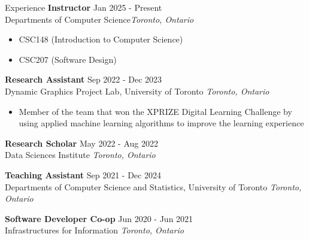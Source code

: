\documentclass{resume} %
\begin{document}
\begin{rSection}{Experience}
    \textbf{Instructor} \hfill Jan 2025 - Present\\Departments of Computer Science\hfill \textit{Toronto, Ontario}
    \begin{itemize}
        \itemsep -3pt {} 
        \item CSC148 (Introduction to Computer Science)
        \item CSC207 (Software Design)
    \end{itemize}
    \textbf{Research Assistant} \hfill Sep 2022 - Dec 2023\\Dynamic Graphics Project Lab, University of Toronto \hfill \textit{Toronto, Ontario}
    \begin{itemize}
        \itemsep -3pt {} 
        \item Member of the team that won the XPRIZE Digital Learning Challenge by using applied machine learning algorithms to improve the learning experience
    \end{itemize}

    \textbf{Research Scholar} \hfill May 2022 - Aug 2022\\Data Sciences Institute \hfill \textit{Toronto, Ontario}

    \textbf{Teaching Assistant} \hfill Sep 2021 - Dec 2024\\Departments of Computer Science and Statistics, University of Toronto \hfill \textit{Toronto, Ontario}
    
    \textbf{Software Developer Co-op} \hfill Jun 2020 - Jun 2021\\Infrastructures for Information \hfill \textit{Toronto, Ontario}

\end{rSection} 
\end{document}
